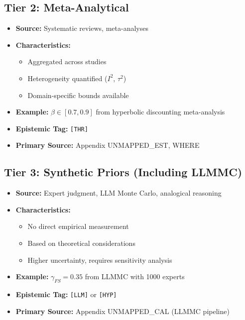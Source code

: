 \subsection{Tier 2: Meta-Analytical}

\begin{itemize}[nosep]
    \item \textbf{Source:} Systematic reviews, meta-analyses
    \item \textbf{Characteristics:}
        \begin{itemize}[nosep]
            \item Aggregated across studies
            \item Heterogeneity quantified ($I^2$, $\tau^2$)
            \item Domain-specific bounds available
        \end{itemize}
    \item \textbf{Example:} $\beta \in [0.7, 0.9]$ from hyperbolic discounting meta-analysis
    \item \textbf{Epistemic Tag:} \texttt{[THR]}
    \item \textbf{Primary Source:} Appendix UNMAPPED_EST, WHERE
\end{itemize}

\subsection{Tier 3: Synthetic Priors (Including LLMMC)}

\begin{itemize}[nosep]
    \item \textbf{Source:} Expert judgment, LLM Monte Carlo, analogical reasoning
    \item \textbf{Characteristics:}
        \begin{itemize}[nosep]
            \item No direct empirical measurement
            \item Based on theoretical considerations
            \item Higher uncertainty, requires sensitivity analysis
        \end{itemize}
    \item \textbf{Example:} $\gamma_{FS} = 0.35$ from LLMMC with 1000 experts
    \item \textbf{Epistemic Tag:} \texttt{[LLM]} or \texttt{[HYP]}
    \item \textbf{Primary Source:} Appendix UNMAPPED_CAL (LLMMC pipeline)
\end{itemize}

